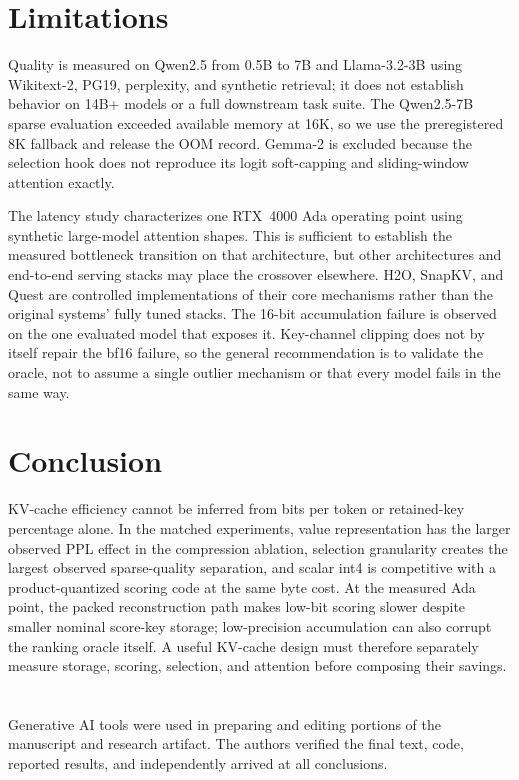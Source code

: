 \documentclass[sigplan,anonymous,review,nonacm]{acmart}
\begin{document}
\section{Limitations}
Quality is measured on Qwen2.5 from 0.5B to 7B and Llama-3.2-3B using Wikitext-2,
PG19, perplexity, and synthetic retrieval; it does not establish behavior on 14B+
models or a full downstream task suite. The Qwen2.5-7B sparse evaluation exceeded
available memory at 16K, so we use the preregistered 8K fallback and release the OOM
record. Gemma-2 is excluded because the selection hook does not reproduce its logit
soft-capping and sliding-window attention exactly.

The latency study characterizes one RTX~4000 Ada operating point using synthetic
large-model attention shapes. This is sufficient to establish the measured
bottleneck transition on that architecture, but other architectures and end-to-end
serving stacks may place the crossover elsewhere. H2O, SnapKV, and Quest are
controlled implementations of their core mechanisms rather than the original
systems' fully tuned stacks. The 16-bit accumulation failure is observed on the one
evaluated model that exposes it. Key-channel clipping does not by itself repair the
bf16 failure, so the general recommendation is to validate the oracle, not to assume
a single outlier mechanism or that every model fails in the same way.

\section{Conclusion}
KV-cache efficiency cannot be inferred from bits per token or retained-key percentage
alone. In the matched experiments, value representation has the larger observed PPL
effect in the compression ablation, selection granularity creates the largest observed
sparse-quality separation, and scalar int4 is competitive with a product-quantized
scoring code at the same byte cost. At the measured Ada point, the packed
reconstruction path makes low-bit scoring slower despite smaller nominal score-key
storage; low-precision accumulation can also corrupt the ranking oracle itself. A
useful KV-cache design must therefore separately measure storage, scoring, selection,
and attention before composing their savings.

\section*{\acksname}
Generative AI tools were used in preparing and editing portions of the manuscript and
research artifact. The authors verified the final text, code, reported results, and independently arrived at all conclusions.



\end{document}
